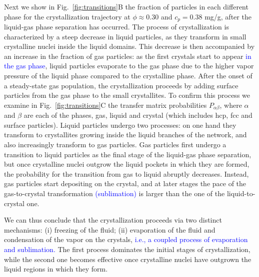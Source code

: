 \documentclass[12pt]{article}
\begin{document}
Next we show in Fig.~\ref{fig:transitions}B the fraction of particles in each different phase for the crystallization trajectory at
$\phi\approx 0.30$ and $c_p=0.38$ mg/g, after the liquid-gas phase separation has occurred. The process of crystallization is characterized 
by a steep decrease in liquid particles, as they transform in small crystalline nuclei inside the liquid domains. This decrease
is then accompanied by an increase in the fraction of gas particles: as the first crystals start to appear \textcolor{blue}{in the gas phase}, liquid particles evaporate 
to the gas phase due to the higher vapor pressure of the liquid phase compared to the crystalline phase. After the onset
of a steady-state gas population, the crystallization proceeds by adding surface particles from the gas phase to the small crystallites. To confirm this process we
examine in Fig.~\ref{fig:transitions}C the transfer matrix probabilities $P_{\alpha\beta}$, where $\alpha$ and $\beta$ are each of the 
phases, gas, liquid and crystal (which includes hcp, fcc and surface particles). Liquid particles undergo two processes: on one
hand they transform to crystallites growing inside the liquid branches of the network, and also increasingly transform to gas particles.
Gas particles first undergo a transition to liquid particles as the final stage of the liquid-gas phase separation, but once
crystalline nuclei outgrow the liquid pockets in which they are formed, the probability for the transition from gas to liquid
abruptly decreases. Instead, gas particles start depositing on the crystal, and at later stages the pace of the gas-to-crystal transformation \textcolor{blue}{(sublimation)}  
is larger than the one of the liquid-to-crystal one.

We can thus conclude that the crystallization proceeds via two distinct mechanisms:
(i) freezing of the fluid; (ii) evaporation of the fluid and condensation of the vapor on the crystals, \textcolor{blue}{i.e., a coupled process of evaporation and sublimation.} 
The first process dominates the initial stages of crystallization, while the second one becomes effective once
crystalline nuclei have outgrown the liquid regions in which they form. 
% 
\end{document}
